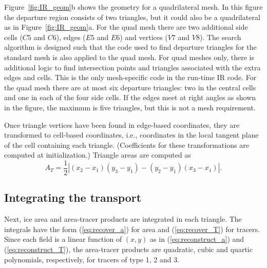 Figure~\ref{fig:IR_geom}b shows the geometry for a quadrilateral mesh. In this figure the departure region consists of two triangles, but it could also be a quadrilateral as in Figure~\ref{fig:IR_geom}a. For the quad mesh there are two additional side cells ($C5$ and $C6$), edges ($E5$ and $E6$) and vertices ($V7$ and $V8$). The search algorithm is designed such that the code used to find departure triangles for the standard mesh is also  applied to the quad mesh. For quad meshes only, there is additional logic to find intersection points and triangles associated with the extra edges and cells. This is the only mesh-specific code in the run-time IR code. For the quad mesh there are at most six departure triangles: two in the central cells and one in each of the four side cells. If the edges meet at right angles as shown in the figure, the maximum is five triangles, but this is not a mesh requirement.

Once triangle vertices have been found in edge-based coordinates, they are transformed to cell-based coordinates, i.e., coordinates in the local tangent plane of the cell containing each triangle. (Coefficients for these transformations are computed at initialization.) Triangle areas are computed as 
\begin{equation}
\label{eq:triangle_area}
{{A}_{T}}=\frac{1}{2}\left| ({{x}_{2}}-{{x}_{1}})({{y}_{3}}-{{y}_{1}})-({{y}_{2}}-{{y}_{1}})({{x}_{3}}-{{x}_{1}}) \right|.
\end{equation}

\subsection{Integrating the transport}
\label{IR_integrate}

Next, ice area and area-tracer products are integrated in each triangle. The integrals have the form (\ref{eq:recover_a}) for area and (\ref{eq:recover_T}) for tracers. Since each field is a linear function of $(x,y)$ as in (\ref{eq:reconstruct_a}) and (\ref{eq:reconstruct_T}), the area-tracer products are quadratic, cubic and quartic polynomials, respectively, for tracers of type 1, 2 and 3.

